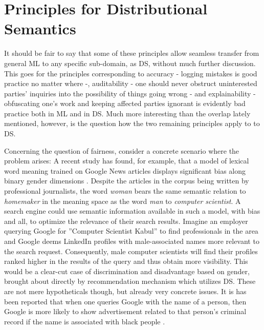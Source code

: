 \documentclass{article}
\begin{document}
\section{Principles for Distributional Semantics}\hypertarget{sec4}{}
It should be fair to say that some of these principles allow seamless transfer from general ML to any specific sub-domain, as DS, without much further discussion.
This goes for the principles corresponding to accuracy - logging mistakes is good practice no matter where -, auditability - one should never obstruct uninterested parties' inquiries into the possibility of things going wrong - and explainability - obfuscating one's work and keeping affected parties ignorant is evidently bad practice both in ML and in DS.
Much more interesting than the overlap lately mentioned, however, is the question how the two remaining principles apply to to DS.

Concerning the question of fairness, consider a concrete scenario where the problem arises: A recent study has found, for example, that a model of lexical word meaning trained on Google News articles displays significant bias along binary gender dimensions \cite{bolukbasi2016man}. Despite the articles in the corpus being written by professional journalists, the word \emph{woman} bears the same semantic relation to \emph{homemaker} in the meaning space as the word \emph{man} to \emph{computer scientist}. A search engine could use semantic information available in such a model, with bias and all, to optimize the relevance of their search results. Imagine an employer querying Google for ''Computer Scientist Kabul'' to find professionals in the area and Google deems LinkedIn profiles with male-associated names more relevant to the search request. Consequently, male computer scientists will find their profiles ranked higher in the results of the query and thus obtain more visibility. This would be a clear-cut case of discrimination and disadvantage based on gender, brought about directly by recommendation mechanism which utilizes DS. These are not mere hypotheticals though, but already very concrete issues. It is has been reported that when one queries Google with the name of a person, then Google is more likely to show advertisement related to that person's criminal record if the name is associated with black people \cite{sweeney2013discrimination}.
\end{document}
